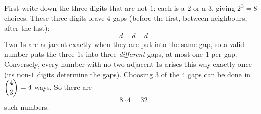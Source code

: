 First write down the three digits that are not $1$; each is a $2$ or a $3$, giving $2^3=8$ choices. These three digits leave $4$ gaps (before the first, between neighbours, after the last):
\[
\_\ \ d\ \ \_\ \ d\ \ \_\ \ d\ \ \_
\]
Two $1$s are adjacent exactly when they are put into the same gap, so a valid number puts the three $1$s into three \emph{different} gaps, at most one $1$ per gap. Conversely, every number with no two adjacent $1$s arises this way exactly once (its non-$1$ digits determine the gaps). Choosing $3$ of the $4$ gaps can be done in $\dbinom43=4$ ways. So there are
\[
8\cdot4=\boxed{32}
\]
such numbers.
